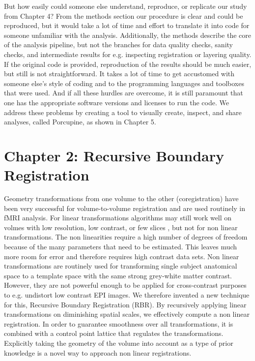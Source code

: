 But how easily could someone else understand, reproduce, or replicate our study from Chapter 4? From the methods section our procedure is clear and could be reproduced, but it would take a lot of time and effort to translate it into code for someone unfamiliar with the analysis. Additionally, the methods describe the core of the analysis pipeline, but not the branches for data quality checks, sanity checks, and intermediate results for e.g. inspecting registration or layering quality. If the original code is provided, reproduction of the results should be much easier, but still is not straightforward. It takes a lot of time to get accustomed with someone else's style of coding and to the programming languages and toolboxes that were used. And if all these hurdles are overcome, it is still paramount that one has the appropriate software versions and licenses to run the code. We address these problems by creating a tool to visually create, inspect, and share analyses, called Porcupine, as shown in Chapter 5.

\section*{Chapter 2: Recursive Boundary Registration}
Geometry transformations from one volume to the other (coregistration) have been very successful for volume-to-volume registration and are used routinely in fMRI analysis. For linear transformations algorithms may still work well on volmes with low resolution, low contrast, or few slices \cite{Greve201}, but not for non linear transformations. The non linearities require a high number of degrees of freedom because of the many parameters that need to be estimated. This leaves much more room for error and therefore requires high contrast data sets. Non linear transformations are routinely used for transforming single subject anatomical space to a template space with the same strong grey-white matter contrast. However, they are not powerful enough to be applied for cross-contrast purposes to e.g. undistort low contrast EPI images. We therefore invented a new technique for this, Recursive Boundary Registration (RBR). By recursively applying linear transformations on diminishing spatial scales, we effectively compute a non linear registration. In order to guarantee smoothness over all transformations, it is combined with a control point lattice that regulates the transformations. Explicitly taking the geometry of the volume into account as a type of prior knowledge is a novel way to approach non linear registrations.

